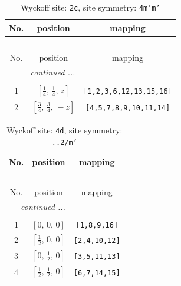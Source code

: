 \documentclass[fleqn,8pt]{jsarticle}
\begin{document}
\renewcommand{\arraystretch}{1.2}
\begin{longtable}{ccc}
\caption{Wyckoff site: {\tt 2c}, site symmetry: {\tt 4m'm'}}
 \\
 \hline \hline
No. & position & mapping \\ \hline \endfirsthead

\multicolumn{2}{l}{\tablename\ \thetable{}} \\
 \hline \hline
No. & position & mapping \\ \hline \endhead

 \hline \hline
\multicolumn{2}{r}{\footnotesize\it continued ...} \\ \endfoot

 \hline \hline
\multicolumn{2}{r}{} \\ \endlastfoot

1 & $\left[ \frac{1}{4},\, \frac{1}{4},\, z \right]$ & {\tt [1,2,3,6,12,13,15,16]} \\ \hline
2 & $\left[ \frac{3}{4},\, \frac{3}{4},\, - z \right]$ & {\tt [4,5,7,8,9,10,11,14]} \\
\end{longtable}
\renewcommand{\arraystretch}{1.2}
\begin{longtable}{ccc}
\caption{Wyckoff site: {\tt 4d}, site symmetry: {\tt ..2/m'}}
 \\
 \hline \hline
No. & position & mapping \\ \hline \endfirsthead

\multicolumn{2}{l}{\tablename\ \thetable{}} \\
 \hline \hline
No. & position & mapping \\ \hline \endhead

 \hline \hline
\multicolumn{2}{r}{\footnotesize\it continued ...} \\ \endfoot

 \hline \hline
\multicolumn{2}{r}{} \\ \endlastfoot

1 & $\left[ 0,\, 0,\, 0 \right]$ & {\tt [1,8,9,16]} \\ \hline
2 & $\left[ \frac{1}{2},\, 0,\, 0 \right]$ & {\tt [2,4,10,12]} \\ \hline
3 & $\left[ 0,\, \frac{1}{2},\, 0 \right]$ & {\tt [3,5,11,13]} \\ \hline
4 & $\left[ \frac{1}{2},\, \frac{1}{2},\, 0 \right]$ & {\tt [6,7,14,15]} \\
\end{longtable}
\renewcommand{\arraystretch}{1.2}
\end{document}
